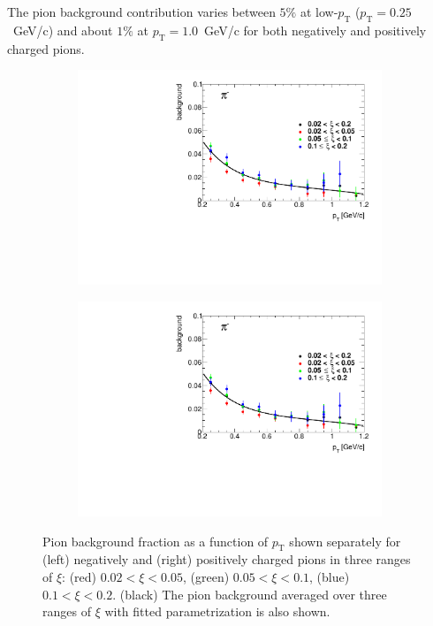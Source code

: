 The pion background contribution varies between $5\%$ at low-$p_\textrm{T}$  ($p_\textrm{T}=0.25$~GeV/c) and about $1\%$ at $p_\textrm{T}=1.0$~GeV/c for both negatively and positively charged pions.
\begin{figure}[htpb]
	\centering
	\begin{subfigure}{.49\textwidth}
		\includegraphics[width=\linewidth, page=1]{chapters/chrgSTAR/img/chargedBkg/bkg0max.pdf}
	\end{subfigure}
	\begin{subfigure}{.49\textwidth}
		\includegraphics[width=\linewidth, page=2]{chapters/chrgSTAR/img/chargedBkg/bkg0max.pdf}
	\end{subfigure}
	\caption{Pion background fraction as a function of $p_\textrm{T}$ shown separately for  (left) negatively  and (right)  positively charged pions in three ranges of $\xi$: (red) $0.02<\xi<0.05$,  (green) $0.05<\xi<0.1$, (blue) $0.1<\xi<0.2$.  (black) The pion background averaged over three ranges of $\xi$ with fitted parametrization is also shown. }
	\label{fig:bkg_pion}
\end{figure}

\FloatBarrier